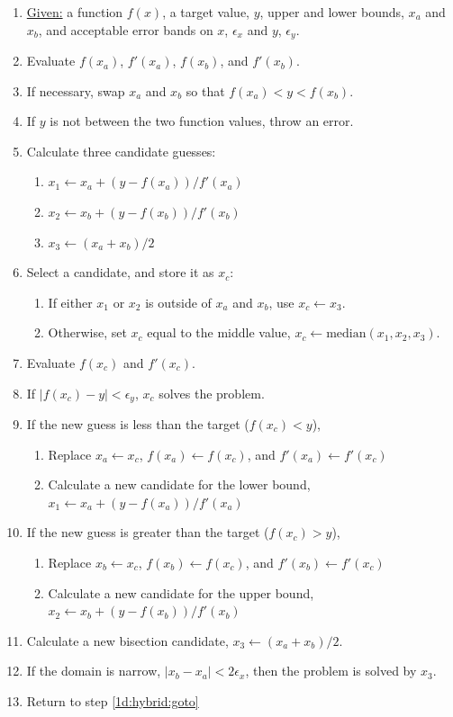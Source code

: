 \documentclass{article}
\begin{document}
\begin{enumerate}
\item \underline{Given:} a function $f(x)$, a target value, $y$, upper and lower bounds, $x_a$ and $x_b$, and acceptable error bands on $x$, $\epsilon_x$ and $y$, $\epsilon_y$.
\item Evaluate $f(x_a)$, $f'(x_a)$, $f(x_b)$, and $f'(x_b)$.
\item If necessary, swap $x_a$ and $x_b$ so that $f(x_a) < y < f(x_b)$.
\item If $y$ is not between the two function values, throw an error.
\item Calculate three candidate guesses:
    \begin{enumerate}
    \item $x_1 \leftarrow x_a + (y-f(x_a))/f'(x_a)$
    \item $x_2 \leftarrow x_b + (y-f(x_b))/f'(x_b)$
    \item $x_3 \leftarrow (x_a + x_b)/2$
    \end{enumerate}
\item Select a candidate, and store it as $x_c$: \label{1d:hybrid:goto}
    \begin{enumerate}
    \item If either $x_1$ or $x_2$ is outside of $x_a$ and $x_b$, use $x_c \leftarrow x_3$.
    \item Otherwise, set $x_c$ equal to the middle value, $x_c \leftarrow \mathrm{median}(x_1, x_2, x_3)$.
    \end{enumerate}
\item Evaluate $f(x_c)$ and $f'(x_c)$.
\item If $|f(x_c) - y| < \epsilon_y$, $x_c$ solves the problem.
\item If the new guess is less than the target ($f(x_c) < y$),
    \begin{enumerate}
    \item Replace $x_a \leftarrow x_c$, $f(x_a) \leftarrow f(x_c)$, and $f'(x_a) \leftarrow f'(x_c)$
    \item Calculate a new candidate for the lower bound, \\$x_1 \leftarrow x_a + (y-f(x_a))/f'(x_a)$
    \end{enumerate}
\item If the new guess is greater than the target ($f(x_c) > y$),
    \begin{enumerate}
    \item Replace $x_b \leftarrow x_c$, $f(x_b) \leftarrow f(x_c)$, and $f'(x_b) \leftarrow f'(x_c)$
    \item Calculate a new candidate for the upper bound, \\$x_2 \leftarrow x_b + (y-f(x_b))/f'(x_b)$
    \end{enumerate}
\item Calculate a new bisection candidate, $x_3 \leftarrow (x_a + x_b)/2$.
\item If the domain is narrow, $|x_b - x_a| < 2\epsilon_x$, then the problem is solved by $x_3$.
\item Return to step \ref{1d:hybrid:goto}
\end{enumerate}
\end{document}
